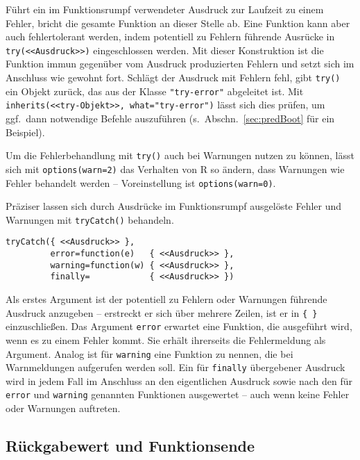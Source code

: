 Führt ein im Funktionsrumpf verwendeter Ausdruck zur Laufzeit zu einem Fehler, bricht die gesamte Funktion an dieser Stelle ab. Eine Funktion kann aber auch fehlertolerant werden, indem potentiell zu Fehlern führende Ausrücke in  \lstinline!try(<<Ausdruck>>)! eingeschlossen werden. Mit dieser Konstruktion ist die Funktion immun gegenüber vom Ausdruck produzierten Fehlern und setzt sich im Anschluss wie gewohnt fort. Schlägt der Ausdruck mit Fehlern fehl, gibt \lstinline!try()! ein Objekt zurück, das aus der Klasse \lstinline!"try-error"! abgeleitet ist. Mit \lstinline!inherits(<<try-Objekt>>, what="try-error")! lässt sich dies prüfen, um ggf.\ dann notwendige Befehle auszuführen (s.\ Abschn.\ \ref{sec:predBoot} für ein Beispiel).

Um die Fehlerbehandlung mit \lstinline!try()! auch bei Warnungen nutzen zu können, lässt sich mit \lstinline!options(warn=2)! das Verhalten von R so ändern, dass Warnungen wie Fehler behandelt werden -- Voreinstellung ist \lstinline!options(warn=0)!.

Präziser lassen sich durch Ausdrücke im Funktionsrumpf ausgelöste Fehler und Warnungen mit  \lstinline!tryCatch()! behandeln.
\begin{lstlisting}
tryCatch({ <<Ausdruck>> },
         error=function(e)   { <<Ausdruck>> },
         warning=function(w) { <<Ausdruck>> },
         finally=            { <<Ausdruck>> })
\end{lstlisting}

Als erstes Argument ist der potentiell zu Fehlern oder Warnungen führende Ausdruck anzugeben -- erstreckt er sich über mehrere Zeilen, ist er in \lstinline!{ }! einzuschließen. Das Argument \lstinline!error! erwartet eine Funktion, die ausgeführt wird, wenn es zu einem Fehler kommt. Sie erhält ihrerseits die Fehlermeldung als Argument. Analog ist für \lstinline!warning! eine Funktion zu nennen, die bei Warnmeldungen aufgerufen werden soll. Ein für \lstinline!finally! übergebener Ausdruck wird in jedem Fall im Anschluss an den eigentlichen Ausdruck sowie nach den für \lstinline!error! und \lstinline!warning! genannten Funktionen ausgewertet -- auch wenn keine Fehler oder Warnungen auftreten.

\subsection{Rückgabewert und Funktionsende}

